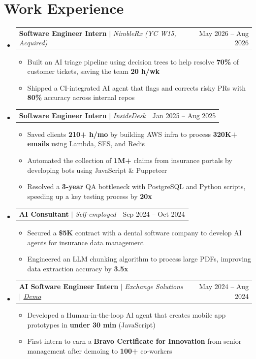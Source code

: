\documentclass[letterpaper,11pt]{article}
\makeatletter
\newcommand{\resumeItem}[1]{
  \item\small{
    {#1 \vspace{-0.6pt}}
  }
}
\newcommand{\resumeSubheadingB}[3]{
  \vspace{0pt}\item
    \begin{tabular*}{0.97\textwidth}[t]{l@{\extracolsep{\fill}}r}
      \textbf{#1} $|$ \textit{#3} & #2 \\
    \end{tabular*}\vspace{-7pt}
}
\newcommand{\resumeSubHeadingListStart}{\begin{itemize}[leftmargin=0.15in, label={}]}
\newcommand{\resumeSubHeadingListEnd}{\end{itemize}}
\newcommand{\resumeItemListStart}{\begin{itemize}}
\newcommand{\resumeItemListEnd}{\end{itemize}\vspace{-7pt}}
\makeatother
\begin{document}
\section{Work Experience}
  \resumeSubHeadingListStart
    \resumeSubheadingB{Software Engineer Intern}{May 2026 -- Aug 2026}{NimbleRx (YC W15, Acquired)}
      \resumeItemListStart
        \resumeItem{Built an AI triage pipeline using decision trees to help resolve \textbf{70\%} of customer tickets, saving the team \textbf{20 h/wk}}
        \resumeItem{Shipped a CI-integrated AI agent that flags and corrects risky PRs with \textbf{80\%} accuracy across internal repos}
      \resumeItemListEnd
    \resumeSubheadingB{Software Engineer Intern}{Jan 2025 -- Aug 2025}{InsideDesk}
      \resumeItemListStart
        \resumeItem{Saved clients \textbf{210+ h/mo} by building AWS infra to process \textbf{320K+ emails} using Lambda, SES, and Redis}
        \resumeItem{Automated the collection of \textbf{1M+} claims from insurance portals by developing bots using JavaScript \& Puppeteer}
        \resumeItem{Resolved a \textbf{3-year} QA bottleneck with PostgreSQL and Python scripts, speeding up a key testing process by \textbf{20x}}
      \resumeItemListEnd
    \resumeSubheadingB{AI Consultant}{Sep 2024 -- Oct 2024}{Self-employed}
      \resumeItemListStart
        \resumeItem{Secured a \textbf{\$5K} contract with a dental software company to develop AI agents for insurance data management}
        \resumeItem{Engineered an LLM chunking algorithm to process large PDFs, improving data extraction accuracy by \textbf{3.5x}}
      \resumeItemListEnd
    \resumeSubheadingB{AI Software Engineer Intern}{May 2024 -- Aug 2024}{Exchange Solutions $|$ \underline{\href{https://www.youtube.com/watch?v=mMaEmro4iEw}{Demo}}}
      \resumeItemListStart
        \resumeItem{Developed a Human-in-the-loop AI agent that creates mobile app prototypes in \textbf{under 30 min} (JavaScript)}
        \resumeItem{First intern to earn a \textbf{Bravo Certificate for Innovation} from senior management after demoing to \textbf{100+} co-workers}
      \resumeItemListEnd\vspace{-10pt}
  \resumeSubHeadingListEnd
\end{document}
